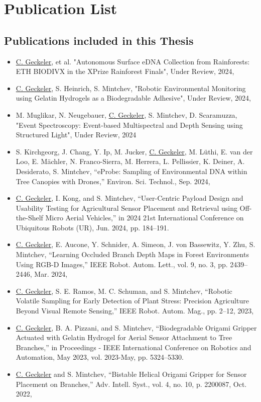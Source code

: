 \chapter{Publication List}
\label{ch:publication-list}

\section{Publications included in this Thesis}


\begin{itemize}
    \item \underline{C. Geckeler}, et al. "Autonomous Surface eDNA Collection from Rainforests: ETH BIODIVX in the XPrize Rainforest Finals", Under Review, 2024,
    \item \underline{C. Geckeler}, S. Heinrich, S. Mintchev, "Robotic Environmental Monitoring using Gelatin Hydrogels as a Biodegradable Adhesive", Under Review, 2024,
    \item M. Muglikar, N. Neugebauer, \underline{C. Geckeler}, S. Mintchev, D. Scaramuzza, "Event Spectroscopy: Event-based Multispectral and Depth Sensing using Structured Light", Under Review, 2024
    \item \cite{Kirchgeorg2024} S. Kirchgeorg, J. Chang, Y. Ip, M. Jucker, \underline{C. Geckeler}, M. Lüthi, E. van der Loo, E. Mächler, N. Franco-Sierra, M. Herrera, L. Pellissier, K. Deiner, A. Desiderato, S. Mintchev, “eProbe: Sampling of Environmental DNA within Tree Canopies with Drones,” Environ. Sci. Technol., Sep. 2024,
    \item \cite{Geckeler2024a} \underline{C. Geckeler}, I. Kong, and S. Mintchev, “User-Centric Payload Design and Usability Testing for Agricultural Sensor Placement and Retrieval using Off-the-Shelf Micro Aerial Vehicles,” in 2024 21st International Conference on Ubiquitous Robots (UR), Jun. 2024, pp. 184–191.
    \item \cite{Geckeler2024} \underline{C. Geckeler}, E. Aucone, Y. Schnider, A. Simeon, J. von Bassewitz, Y. Zhu, S. Mintchev, “Learning Occluded Branch Depth Maps in Forest Environments Using RGB-D Images,” IEEE Robot. Autom. Lett., vol. 9, no. 3, pp. 2439–2446, Mar. 2024,
    \item \cite{Geckeler2023a} \underline{C. Geckeler}, S. E. Ramos, M. C. Schuman, and S. Mintchev, “Robotic Volatile Sampling for Early Detection of Plant Stress: Precision Agriculture Beyond Visual Remote Sensing,” IEEE Robot. Autom. Mag., pp. 2–12, 2023,
    \item \cite{Geckeler2023b} \underline{C. Geckeler}, B. A. Pizzani, and S. Mintchev, “Biodegradable Origami Gripper Actuated with Gelatin Hydrogel for Aerial Sensor Attachment to Tree Branches,” in Proceedings - IEEE International Conference on Robotics and Automation, May 2023, vol. 2023-May, pp. 5324–5330.
    \item \cite{Geckeler2022a} \underline{C. Geckeler} and S. Mintchev, “Bistable Helical Origami Gripper for Sensor Placement on Branches,” Adv. Intell. Syst., vol. 4, no. 10, p. 2200087, Oct. 2022,    
\end{itemize}

